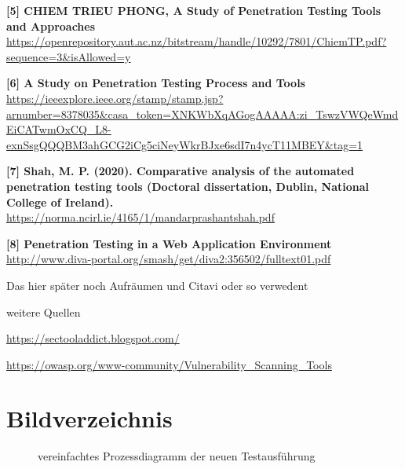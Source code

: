 	\textbf{[5] CHIEM TRIEU PHONG, A Study of Penetration Testing Tools
		and Approaches} \\
	\url{https://openrepository.aut.ac.nz/bitstream/handle/10292/7801/ChiemTP.pdf?sequence=3&isAllowed=y}
	
	\textbf{[6] A Study on Penetration Testing Process and Tools } \\
	\url{https://ieeexplore.ieee.org/stamp/stamp.jsp?arnumber=8378035&casa_token=XNKWbXqAGogAAAAA:zi_TswzVWQeWmdEiCATwmOxCQ_L8-exnSsgQQQBM3ahGCG2iCg5ciNeyWkrBJxe6sdI7n4ycT11MBEY&tag=1}
	
	\textbf{[7] Shah, M. P. (2020). Comparative analysis of the automated penetration testing tools (Doctoral dissertation, Dublin, National College of Ireland).} \\
	\url{https://norma.ncirl.ie/4165/1/mandarprashantshah.pdf}
	
	\textbf{[8] Penetration Testing in a Web
		Application Environment} \\
	\url{http://www.diva-portal.org/smash/get/diva2:356502/fulltext01.pdf}
	
	Das hier später noch Aufräumen und Citavi oder so verwedent
	
	weitere Quellen
	
	\url{https://sectooladdict.blogspot.com/}
	
	\url{https://owasp.org/www-community/Vulnerability_Scanning_Tools}
	
\section{Bildverzeichnis}


\begin{figure}[H]
	\centering 
	\caption{vereinfachtes Prozessdiagramm der neuen Testausführung} \cite{Quelle: eigene Darsetllung}
	\label{BPMN}
\end{figure}
